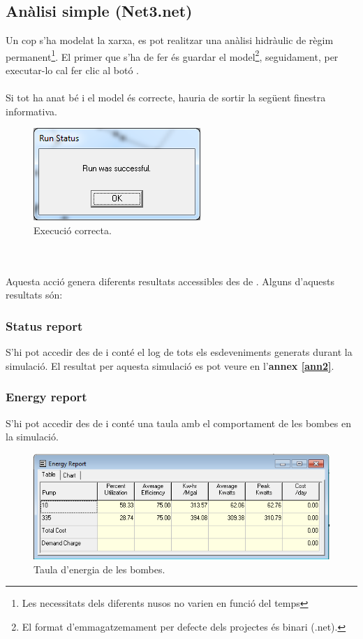 \documentclass[12pt]{article}
\begin{document}
\subsection{Anàlisi simple (Net3.net)}
Un cop s'ha modelat la xarxa, es pot realitzar una anàlisi hidràulic de règim permanent\footnote{Les necessitats dels diferents nusos no varien en funció del temps}. El primer que s'ha de fer és guardar el model\footnote{El format d'emmagatzemament per defecte dels projectes és binari (.net).}, seguidament, per executar-lo cal fer clic al botó . 
\\\\Si tot ha anat bé i el model és correcte, hauria de sortir la següent finestra informativa.
\begin{figure}[h!]
	\centering
	\includegraphics[scale=.5]{imatges/epanet/12.png}
	\caption{Execució correcta.}
\end{figure}
\\\\Aquesta acció genera diferents resultats accessibles des de . Alguns d'aquests resultats són:
\subsubsection{Status report}
S'hi pot accedir des de  i conté el log de tots els esdeveniments generats durant la simulació. El resultat per aquesta simulació es pot veure en l'\textbf{annex \ref{ann2}}.

\subsubsection{Energy report}
S'hi pot accedir des de  i conté una taula amb el comportament de les bombes en la simulació.
\begin{figure}[h!]
	\centering
	\includegraphics[scale=.5]{imatges/epanet/reports/energia.png}
	\caption{Taula d'energia de les bombes.}
\end{figure}
\end{document}
